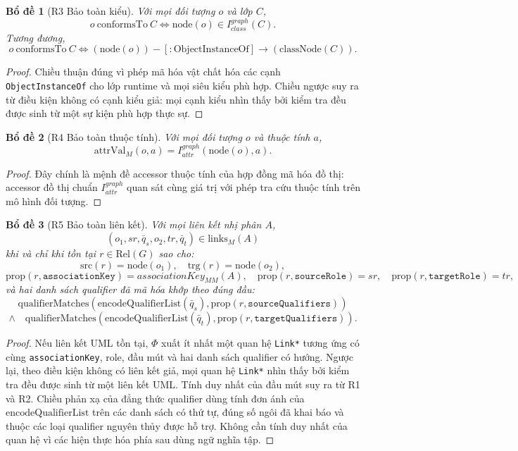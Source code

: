 \documentclass[11pt,a4paper]{article}
\newtheorem{lemma}{Bổ đề}
\theoremstyle{definition}
\newcommand{\Rel}{\mathrm{Rel}}
\newcommand{\node}{\mathrm{node}}
\newcommand{\classNode}{\mathrm{classNode}}
\newcommand{\prop}{\mathrm{prop}}
\newcommand{\src}{\mathrm{src}}
\newcommand{\trg}{\mathrm{trg}}
\newcommand{\PhiEnc}{\Phi}
\begin{document}
\begin{lemma}[R3 Bảo toàn kiểu]
Với mọi đối tượng $o$ và lớp $C$,
\[
o \ \mathrm{conformsTo}\ C
\iff
\node(o)\in I^{graph}_{class}(C).
\]
Tương đương,
\[
o \ \mathrm{conformsTo}\ C
\iff
(\node(o))-[:\mathrm{ObjectInstanceOf}]\to(\classNode(C)).
\]
\end{lemma}
\begin{proof}
Chiều thuận đúng vì phép mã hóa vật chất hóa các cạnh
\texttt{ObjectInstanceOf} cho lớp runtime và mọi siêu kiểu phù hợp. Chiều
ngược suy ra từ điều kiện không có cạnh kiểu giả: mọi cạnh kiểu nhìn thấy bởi
kiểm tra đều được sinh từ một sự kiện phù hợp thực sự.
\end{proof}

\begin{lemma}[R4 Bảo toàn thuộc tính]
Với mọi đối tượng $o$ và thuộc tính $a$,
\[
\mathrm{attrVal}_M(o,a)=I^{graph}_{attr}(\node(o),a).
\]
\end{lemma}
\begin{proof}
Đây chính là mệnh đề accessor thuộc tính của hợp đồng mã hóa đồ thị: accessor
đồ thị chuẩn $I^{graph}_{attr}$ quan sát cùng giá trị với phép tra cứu thuộc
tính trên mô hình đối tượng.
\end{proof}

\begin{lemma}[R5 Bảo toàn liên kết]
Với mọi liên kết nhị phân $A$,
\[
(o_1,sr,\bar q_s,o_2,tr,\bar q_t)\in \mathrm{links}_M(A)
\]
khi và chỉ khi tồn tại $r\in \Rel(G)$ sao cho:
\[
\src(r)=\node(o_1),\quad \trg(r)=\node(o_2),
\]
\[
\prop(r,\texttt{associationKey})=associationKey_{MM}(A),\quad
\prop(r,\texttt{sourceRole})=sr,\quad
\prop(r,\texttt{targetRole})=tr,
\]
và hai danh sách qualifier đã mã hóa khớp theo đúng đầu:
\[
\mathrm{qualifierMatches}(\mathrm{encodeQualifierList}(\bar q_s),
  \prop(r,\texttt{sourceQualifiers}))
\]
\[
\land\quad
\mathrm{qualifierMatches}(\mathrm{encodeQualifierList}(\bar q_t),
  \prop(r,\texttt{targetQualifiers})).
\]
\end{lemma}
\begin{proof}
Nếu liên kết UML tồn tại, $\PhiEnc$ xuất ít nhất một quan hệ \texttt{Link*}
tương ứng có cùng \texttt{associationKey}, role, đầu mút và hai danh sách
qualifier có hướng. Ngược lại,
theo điều kiện không có liên kết giả, mọi quan hệ \texttt{Link*} nhìn thấy bởi
kiểm tra đều được sinh từ một liên kết UML. Tính duy nhất của đầu mút suy ra từ
R1 và R2. Chiều phản xạ của đẳng thức qualifier dùng tính đơn ánh của
$\mathrm{encodeQualifierList}$ trên các danh sách có thứ tự, đúng số ngôi đã
khai báo và thuộc các loại qualifier nguyên thủy được hỗ trợ. Không cần tính
duy nhất của quan hệ vì các hiện thực hóa phía sau dùng ngữ nghĩa tập.
\end{proof}
\end{document}
